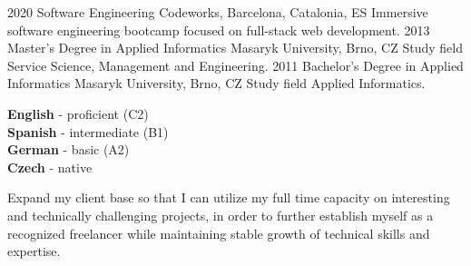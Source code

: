 \documentclass[9pt]{developercv}
\begin{document}

\begin{entrylist}
  \entry
  {2020}
  {Software Engineering}
  {Codeworks, Barcelona, Catalonia, ES}
  {Immersive software engineering bootcamp focused on full-stack web development.}
  \entry
  {2013}
  {Master's Degree in Applied Informatics}
  {Masaryk University, Brno, CZ}
  {Study field Service Science, Management and Engineering.}
  \entry
  {2011}
  {Bachelor's Degree  in Applied Informatics}
  {Masaryk University, Brno, CZ}
  {Study field Applied Informatics.}
\end{entrylist}


\begin{minipage}[t]{0.45\textwidth}
  \vspace{-\baselineskip}


  \textbf{English} - proficient (C2)\\
  \textbf{Spanish} - intermediate (B1)\\
  \textbf{German} - basic (A2)\\
  \textbf{Czech} - native
\end{minipage}
\begin{minipage}[t]{0.55\textwidth}
  \vspace{-\baselineskip}


  Expand my client base so that I can utilize my full time capacity on interesting and technically challenging projects, in order to further establish myself as a recognized freelancer while maintaining stable growth of technical skills and expertise.
\end{minipage}
\end{document}
